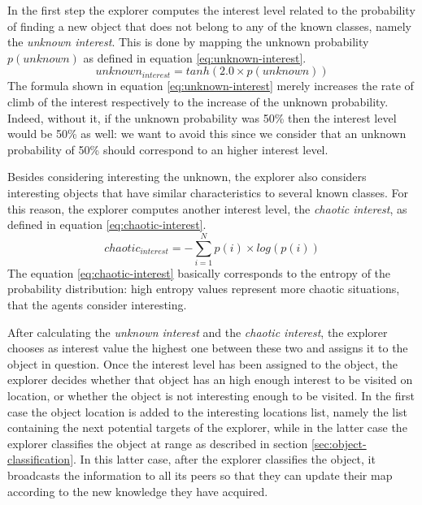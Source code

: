 \documentclass[a4paper, 10pt, conference]{ieeeconf}      %
\begin{document}
In the first step the explorer computes the interest level related to the probability of finding a new object that does not belong to any of the known classes, namely the \emph{unknown interest}. This is done by mapping the unknown probability $p(unknown)$ as defined in equation \eqref{eq:unknown-interest}.
\begin{equation}\label{eq:unknown-interest}
    unknown_{interest} = tanh(2.0 \times p(unknown))
\end{equation}
The formula shown in equation \eqref{eq:unknown-interest} merely increases the rate of climb of the interest respectively to the increase of the unknown probability. Indeed, without it, if the unknown probability was 50\% then the interest level would be 50\% as well: we want to avoid this since we consider that an unknown probability of 50\% should correspond to an higher interest level. 

Besides considering interesting the unknown, the explorer also considers interesting objects that have similar characteristics to several known classes. For this reason, the explorer computes another interest level, the \emph{chaotic interest}, as defined in equation \eqref{eq:chaotic-interest}. 
\begin{equation}\label{eq:chaotic-interest}
    chaotic_{interest} = - \sum_{i=1}^{N}p(i)\times log(p(i))
\end{equation}
The equation \eqref{eq:chaotic-interest} basically corresponds to the entropy of the probability distribution: high entropy values represent more chaotic situations, that the agents consider interesting. 

After calculating the \emph{unknown interest} and the \emph{chaotic interest}, the explorer chooses as interest value the highest one between these two and assigns it to the object in question. Once the interest level has been assigned to the object, the explorer decides whether that object has an high enough interest to be visited on location, or whether the object is not interesting enough to be visited. In the first case the object location is added to the interesting locations list, namely the list containing the next potential targets of the explorer, while in the latter case the explorer classifies the object at range as described in section \ref{sec:object-classification}. In this latter case, after the explorer classifies the object, it broadcasts the information to all its peers so that they can update their map according to the new knowledge they have acquired. 
\end{document}

